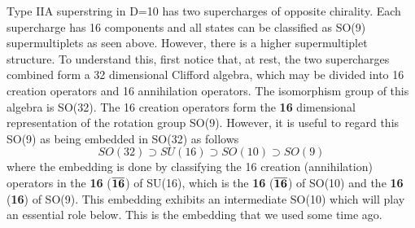 Type IIA superstring in D=10 has two supercharges of opposite chirality.
Each supercharge has 16 components and all states can be classified as SO(9)
supermultiplets as seen above. However, there is a higher supermultiplet
structure. To understand this, first notice that, at rest, the two
supercharges combined form a 32 dimensional Clifford algebra, which may be
divided into 16 creation operators and 16 annihilation operators. The
isomorphism group of this algebra is SO(32). The 16 creation operators form
the {\bf 16} dimensional representation of the rotation group SO(9).
However, it is useful to regard this SO(9) as being embedded in SO(32) as
follows
\begin{equation}
SO(32)\supset SU(16)\supset SO(10)\supset SO(9)
\end{equation}
where the embedding is done by classifying the 16 creation (annihilation)
operators in the {\bf 16} ($\overline{{\bf 16}}$) of SU(16), which is the
{\bf 16} ($\overline{{\bf 16}}$) of SO(10) and the {\bf 16} ({\bf 16}) of
SO(9). This embedding exhibits an intermediate SO(10) which will play an
essential role below. This is the embedding that we used some time ago\cite
{ibmembrane}.

